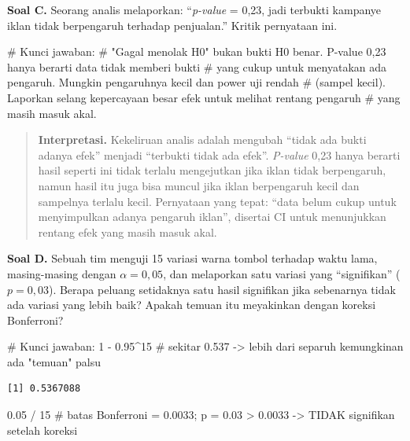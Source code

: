 \documentclass[
  indonesian,
  letterpaper,
]{book}
\newenvironment{Shaded}{\begin{snugshade}}{\end{snugshade}}
\newcommand{\CommentTok}[1]{\textcolor[rgb]{0.37,0.37,0.37}{#1}}
\newcommand{\DecValTok}[1]{\textcolor[rgb]{0.68,0.00,0.00}{#1}}
\newcommand{\FloatTok}[1]{\textcolor[rgb]{0.68,0.00,0.00}{#1}}
\newcommand{\SpecialCharTok}[1]{\textcolor[rgb]{0.37,0.37,0.37}{#1}}
\begin{document}
\textbf{Soal C.} Seorang analis melaporkan: ``\emph{p-value} = 0,23,
jadi terbukti kampanye iklan tidak berpengaruh terhadap penjualan.''
Kritik pernyataan ini.

\begin{Shaded}
\begin{Highlighting}[]
\CommentTok{\# Kunci jawaban:}
\CommentTok{\# "Gagal menolak H0" bukan bukti H0 benar. P{-}value 0,23 hanya berarti data tidak memberi bukti}
\CommentTok{\# yang cukup untuk menyatakan ada pengaruh. Mungkin pengaruhnya kecil dan power uji rendah}
\CommentTok{\# (sampel kecil). Laporkan selang kepercayaan besar efek untuk melihat rentang pengaruh}
\CommentTok{\# yang masih masuk akal.}
\end{Highlighting}
\end{Shaded}

\begin{quote}
\textbf{Interpretasi.} Kekeliruan analis adalah mengubah ``tidak ada
bukti adanya efek'' menjadi ``terbukti tidak ada efek''. \emph{P-value}
0,23 hanya berarti hasil seperti ini tidak terlalu mengejutkan jika
iklan tidak berpengaruh, namun hasil itu juga bisa muncul jika iklan
berpengaruh kecil dan sampelnya terlalu kecil. Pernyataan yang tepat:
``data belum cukup untuk menyimpulkan adanya pengaruh iklan'', disertai
CI untuk menunjukkan rentang efek yang masih masuk akal.
\end{quote}

\textbf{Soal D.} Sebuah tim menguji 15 variasi warna tombol terhadap
waktu lama, masing-masing dengan \(\alpha = 0{,}05\), dan melaporkan
satu variasi yang ``signifikan'' (\(p = 0{,}03\)). Berapa peluang
setidaknya satu hasil signifikan jika sebenarnya tidak ada variasi yang
lebih baik? Apakah temuan itu meyakinkan dengan koreksi Bonferroni?

\begin{Shaded}
\begin{Highlighting}[]
\CommentTok{\# Kunci jawaban:}
\DecValTok{1} \SpecialCharTok{{-}} \FloatTok{0.95}\SpecialCharTok{\^{}}\DecValTok{15}   \CommentTok{\# sekitar 0.537 {-}\textgreater{} lebih dari separuh kemungkinan ada "temuan" palsu}
\end{Highlighting}
\end{Shaded}

\begin{verbatim}
[1] 0.5367088
\end{verbatim}

\begin{Shaded}
\begin{Highlighting}[]
\FloatTok{0.05} \SpecialCharTok{/} \DecValTok{15}     \CommentTok{\# batas Bonferroni = 0.0033; p = 0.03 \textgreater{} 0.0033 {-}\textgreater{} TIDAK signifikan setelah koreksi}
\end{Highlighting}
\end{Shaded}
\end{document}
